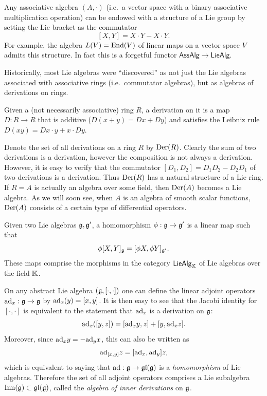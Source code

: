 \begin{example}
    Any associative algebra $(A,\cdot)$ (i.e.~a vector space with a binary associative multiplication operation) can be endowed with a structure of a Lie group by setting the Lie bracket as the commutator
    \[[X,Y]=X\cdot Y-X\cdot Y.\]
    For example, the algebra $\boldsymbol{\mathrm{\mathrm}}{L}(V)=\operatorname{End}(V)$ of linear maps on a vector space $V$ admits this structure. In fact this is a forgetful functor $\mathsf{AssAlg}\to\mathsf{LieAlg}$.
\end{example}

Historically, most Lie algebras were ``discovered'' as not just the Lie algebras associated with associative rings (i.e.~commutator algebras), but as algebras of derivations on rings.

\begin{defn}[Derivation]
    Given a (not necessarily associative) ring $R$, a derivation on it is a map $D:R\to R$ that is additive ($D(x+y)=Dx+Dy$) and satisfies the Leibniz rule $D(xy)=Dx\cdot y+x\cdot Dy$.
\end{defn}

\begin{example}
    Denote the set of all derivations on a ring $R$ by $\operatorname{Der}(R)$. Clearly the sum of two derivations is a derivation, however the composition is not always a derivation. However, it is easy to verify that the commutator $[D_1,D_2]=D_1D_2-D_2D_1$ of two derivations is a derivation. Thus $\operatorname{Der}(R)$ has a natural structure of a Lie ring. If $R=A$ is actually an algebra over some field, then $\operatorname{Der}(A)$ becomes a Lie algebra. As we will soon see, when $A$ is an algebra of smooth scalar functions, $\operatorname{Der}(A)$ consists of a certain type of differential operators.
\end{example}



\begin{defn}
    Given two Lie algebras $\mathfrak{g},\mathfrak{g}'$, a homomorphism $\phi:\mathfrak{g}\to\mathfrak{g}'$ is a linear map such that 
    \[\phi[X,Y]_{\mathfrak{g}}=[\phi X,\phi Y]_{\mathfrak{g}'}.\]
    These maps comprise the morphisms in the category $\mathsf{LieAlg}_{\mathbb{K}}$ of Lie algebras over the field $\mathbb{K}$.
\end{defn}


\begin{example}
    On any abstract Lie algebra $(\mathfrak{g},[\cdot,\cdot])$ one can define the linear adjoint operators $\mathrm{ad}_x:\mathfrak{g}\to\mathfrak{g}$ by $\mathrm{ad}_x(y)=[x,y]$. It is then easy to see that the Jacobi identity for $[\cdot,\cdot]$ is equivalent to the statement that $\mathrm{ad}_x$ is a derivation on $\mathfrak{g}$:
    \[\mathrm{ad}_x([y,z])=[\mathrm{ad}_x y,z]+[y,\mathrm{ad}_x z].\]
    Moreover, since $\mathrm{ad}_x y=-\mathrm{ad}_y x$, this can also be written as
    \[\mathrm{ad}_{[x,y]}z=[\mathrm{ad}_x,\mathrm{ad}_y]z,\]
    which is equivalent to saying that $\mathrm{ad}:\mathfrak{g}\to \mathfrak{gl}(\mathfrak{g})$ is a \emph{homomorphism} of Lie algebras. Therefore the set of all adjoint operators comprises a Lie subalgebra $\operatorname{Inn}(\mathfrak{g})\subset \mathfrak{gl}(\mathfrak{g})$, called the \emph{algebra of inner derivations} on $\mathfrak{g}$.
\end{example}



